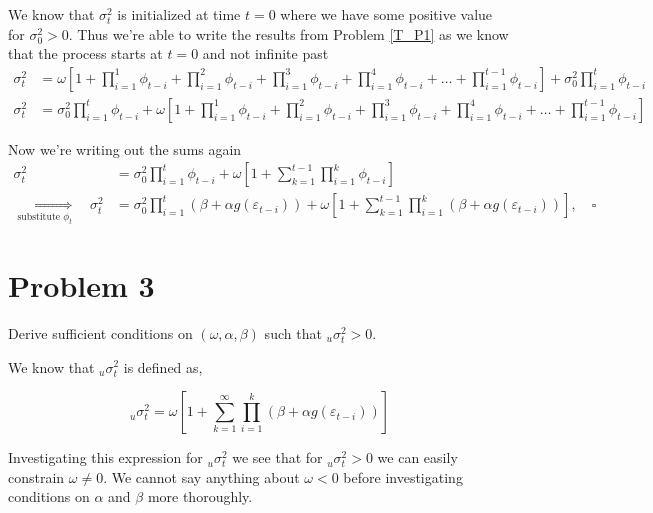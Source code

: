 \documentclass{EconHomework}
\begin{document}
We know that $\sigma_{t}^{2}$ is initialized at time $t=0$ where
we have some positive value for $\sigma_{0}^{2}>0$. Thus we're able
to write the results from Problem \ref{T_P1} as we know that the
process starts at $t=0$ and not infinite past
\begin{align*}
\sigma_{t}^{2} & =\omega\left[1+\prod_{i=1}^{1}\phi_{t-i}+\prod_{i=1}^{2}\phi_{t-i}+\prod_{i=1}^{3}\phi_{t-i}+\prod_{i=1}^{4}\phi_{t-i}+\dots+\prod_{i=1}^{t-1}\phi_{t-i}\right]+\sigma_{0}^{2}\prod_{i=1}^{t}\phi_{t-i}\\
\sigma_{t}^{2} & =\sigma_{0}^{2}\prod_{i=1}^{t}\phi_{t-i}+\omega\left[1+\prod_{i=1}^{1}\phi_{t-i}+\prod_{i=1}^{2}\phi_{t-i}+\prod_{i=1}^{3}\phi_{t-i}+\prod_{i=1}^{4}\phi_{t-i}+\dots+\prod_{i=1}^{t-1}\phi_{t-i}\right]
\end{align*}

Now we're writing out the sums again
\begin{align*}
\sigma_{t}^{2} & =\sigma_{0}^{2}\prod_{i=1}^{t}\phi_{t-i}+\omega\left[1+\sum_{k=1}^{t-1}\prod_{i=1}^{k}\phi_{t-i}\right]\\
\underset{\text{substitute }\phi_{t}}{\Longrightarrow}\quad\sigma_{t}^{2} & =\sigma_{0}^{2}\prod_{i=1}^{t}\left(\beta+\alpha g\left(\varepsilon_{t-i}\right)\right)+\omega\left[1+\sum_{k=1}^{t-1}\prod_{i=1}^{k}\left(\beta+\alpha g\left(\varepsilon_{t-i}\right)\right)\right],\quad\square
\end{align*}

\pagebreak

\section{Problem 3}

\begin{tcolorbox}[colback=white]
    Derive sufficient conditions on $\left(\omega,\alpha,\beta\right)$ such that $_{u}\sigma_{t}^{2}>0$.
\end{tcolorbox}



We know that $_{u}\sigma_{t}^{2}$ is defined as,

\[
_{u}\sigma_{t}^{2}=\omega\left[1+\sum_{k=1}^{\infty}\prod_{i=1}^{k}\left(\beta+\alpha g\left(\varepsilon_{t-i}\right)\right)\right]
\]

Investigating this expression for $_{u}\sigma_{t}^{2}$ we see that
for $_{u}\sigma_{t}^{2}>0$ we can easily constrain $\omega\neq0$.
We cannot say anything about $\omega<0$ before investigating conditions
on $\alpha$ and $\beta$ more thoroughly.
\end{document}
